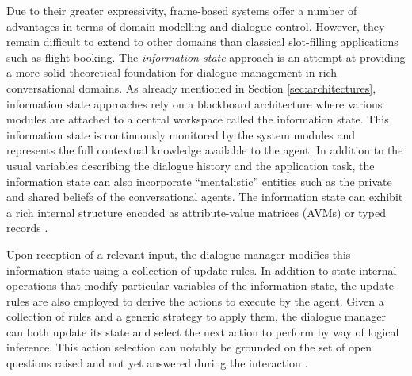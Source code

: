 Due to their greater expressivity, frame-based systems offer a number of advantages in terms of domain modelling and dialogue control.  However, they remain difficult to extend to other domains than classical slot-filling applications such as flight booking.  The \textit{information state} approach \citep{Larsson:2000} is an attempt at providing a more solid theoretical foundation for dialogue management in rich conversational domains.  As already mentioned in Section \ref{sec:architectures}, information state approaches rely on a blackboard architecture where various modules are attached to a central workspace called the information state. This information state is continuously monitored by the system modules and represents the full contextual knowledge available to the agent. In addition to the usual variables describing the dialogue history and the application task, the information state can also incorporate ``mentalistic'' entities such as the private and shared beliefs of the conversational agents.  The information state can exhibit a rich internal structure encoded as attribute-value matrices (AVMs) or typed records  \citep{RobinCooper2012}. 

Upon reception of a relevant input, the dialogue manager modifies this information state using a collection of update rules. In addition to state-internal operations that modify particular variables of the information state, the update rules are also employed to derive the actions to execute by the agent.  Given a collection of rules and a generic strategy to apply them, the dialogue manager can both update its state and select the next action to perform by way of logical inference. This action selection can notably be grounded on the set of open questions raised and not yet answered during the interaction \citep{larsson2002,Ginzburg2012}.  

